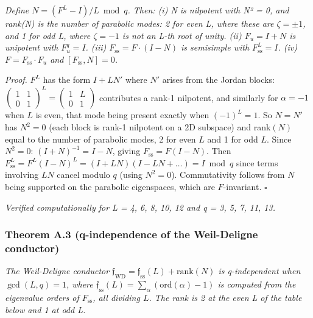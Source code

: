 \documentclass[
]{article}
\begin{document}
\emph{Define \(N = (F^L - I)/L \bmod q\). Then: (i) N is nilpotent with
N² = 0, and rank(N) is the number of parabolic modes: 2 for even L,
where these are \(\zeta = \pm 1\), and 1 for odd L, where \(\zeta = -1\)
is not an L-th root of unity. (ii) \(F_u = I + N\) is unipotent with
\(F_u^q = I\). (iii) \(F_{\mathrm{ss}} = F \cdot (I - N)\) is semisimple
with \(F_{\mathrm{ss}}^L = I\). (iv) \(F = F_{\mathrm{ss}} \cdot F_u\)
and \([F_{\mathrm{ss}}, N] = 0\).}

\emph{Proof.} \(F^L\) has the form \(I + LN'\) where \(N'\) arises from
the Jordan blocks:
\(\left(\begin{smallmatrix} 1 & 1 \\ 0 & 1 \end{smallmatrix}\right)^L = \left(\begin{smallmatrix} 1 & L \\ 0 & 1 \end{smallmatrix}\right)\)
contributes a rank-1 nilpotent, and similarly for \(\alpha = -1\) when
\(L\) is even, that mode being present exactly when \((-1)^L = 1\). So
\(N = N'\) has \(N^2 = 0\) (each block is rank-1 nilpotent on a 2D
subspace) and rank\((N)\) equal to the number of parabolic modes, 2 for
even \(L\) and 1 for odd \(L\). Since \(N^2 = 0\):
\((I + N)^{-1} = I - N\), giving \(F_{\mathrm{ss}} = F(I - N)\). Then
\(F_{\mathrm{ss}}^L = F^L(I - N)^L = (I + LN)(I - LN + \ldots) = I \bmod q\)
since terms involving \(LN\) cancel modulo \(q\) (using \(N^2 = 0\)).
Commutativity follows from \(N\) being supported on the parabolic
eigenspaces, which are \(F\)-invariant. \(\square\)

\emph{Verified computationally for L = 4, 6, 8, 10, 12 and q = 3, 5, 7,
11, 13.}

\hypertarget{theorem-a.3-q-independence-of-the-weil-deligne-conductor}{%
\subsubsection{Theorem A.3 (q-independence of the Weil-Deligne
conductor)}\label{theorem-a.3-q-independence-of-the-weil-deligne-conductor}}

\emph{The Weil-Deligne conductor
\(\mathfrak{f}_{\mathrm{WD}} = \mathfrak{f}_{\mathrm{ss}}(L) + \mathrm{rank}(N)\)
is q-independent when \(\gcd(L, q) = 1\), where
\(\mathfrak{f}_{\mathrm{ss}}(L) = \sum_\alpha (\mathrm{ord}(\alpha) - 1)\)
is computed from the eigenvalue orders of \(F_{\mathrm{ss}}\), all
dividing \(L\). The rank is 2 at the even L of the table below and 1 at
odd L.}
\end{document}
